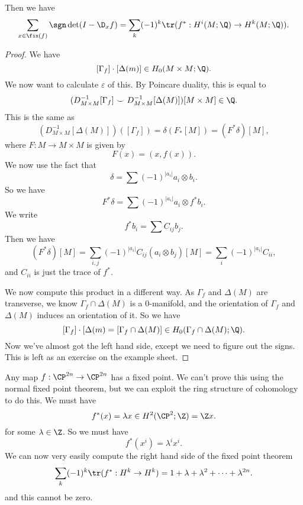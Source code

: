\documentclass[a4paper]{article}
\begin{document}
Then we have
\[
  \sum_{x \in \fix(f)} \sgn \det(I - \D_x f) = \sum_k (-1)^k \tr(f^*: H^i(M; \Q) \to H^k(M; \Q)).
\]
\begin{proof}
  We have
  \[
    [\Gamma_f] \cdot [\Delta (m)] \in H_0(M \times M; \Q).
  \]
  We now want to calculate $\varepsilon$ of this. By Poincare duality, this is equal to
  \[
    (D_{M \times M}^{-1}[\Gamma_f] \smile D_{M \times M}^{-1}[\Delta(M)])[M \times M] \in \Q.
  \]
  This is the same as
  \[
    (D_{M \times M}^{-1} [\Delta(M)]) ([\Gamma_f]) = \delta(F_*[M]) = (F^* \delta)[M],
  \]
  where $F: M \to M \times M$ is given by
  \[
    F(x) = (x, f(x)).
  \]
  We now use the fact that
  \[
    \delta = \sum (-1)^{|a_i|} a_i \otimes b_i.
  \]
  So we have
  \[
    F^* \delta = \sum (-1)^{|a_i|} a_i \otimes f^* b_i.
  \]
  We write
  \[
    f^* b_i = \sum C_{ij} b_j.
  \]
  Then we have
  \[
    (F^* \delta)[M] = \sum_{i, j} (-1)^{|a_i|} C_{ij} (a_i \otimes b_j) [M] = \sum_i (-1)^{|a_i|} C_{ii},
  \]
  and $C_{ii}$ is just the trace of $f^*$.

  We now compute this product in a different way. As $\Gamma_f$ and $\Delta (M)$ are transverse, we know $\Gamma_f \cap \Delta(M)$ is a $0$-manifold, and the orientation of $\Gamma_f$ and $\Delta(M)$ induces an orientation of it. So we have
  \[
    [\Gamma_f] \cdot [\Delta(m) = [\Gamma_f \cap \Delta(M)] \in H_0(\Gamma_f \cap \Delta(M); \Q).
  \]
  Now we've almost got the left hand side, except we need to figure out the signs. This is left as an exercise on the example sheet.
\end{proof}

\begin{eg}
  Any map $f: \CP^{2n} \to \CP^{2n}$ has a fixed point. We can't prove this using the normal fixed point theorem, but we can exploit the ring structure of cohomology to do this. We must have
  \[
    f^*(x) = \lambda x \in H^2(\CP^2; \Z) = \Z x.
  \]
  for some $\lambda \in \Z$. So we must have
  \[
    f^*(x^i) = \lambda^i x^i.
  \]
  We can now very easily compute the right hand side of the fixed point theorem
  \[
    \sum_k (-1)^k \tr(f^*: H^k \to H^k) = 1 + \lambda + \lambda^2 + \cdots + \lambda^{2n}.
  \]
  and this cannot be zero.
\end{eg}

\printindex
\end{document}
